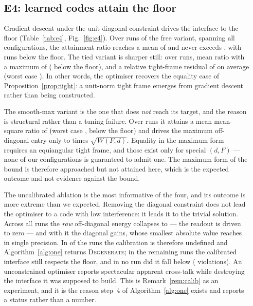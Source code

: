 \subsection{E4: learned codes attain the floor}
\label{sec:res-e4}

Gradient descent under the unit-diagonal constraint drives the interface to the floor
(Table~\ref{tab:e4}, Fig.~\ref{fig:e4}). Over
\EfourFreeRuns{} runs of the free variant, spanning all \EfourConfigs{} configurations, the
attainment ratio reaches a mean of \EfourFreeRatioMean{} and never exceeds
\EfourFreeRatioMax, with \EfourFreeBelowFloor{} runs below the floor. The tied variant is
sharper still: over \EfourTiedRuns{} runs, mean ratio \EfourTiedRatioMean{} with a maximum of
\EfourTiedRatioMax{} (\EfourTiedBelowFloor{} below the floor), and a relative tight-frame
residual of \EfourTiedFrameResidualMean{} on average (worst case
\EfourTiedFrameResidualMax). In other words, the optimiser recovers the equality case of
Proposition~\ref{prop:tight}: a unit-norm tight frame emerges from gradient descent rather than
being constructed.

The smooth-max variant is the one that does \emph{not} reach its target, and the reason is
structural rather than a tuning failure. Over \EfourSoftmaxRuns{} runs it attains a mean
mean-square ratio of \EfourSoftmaxRatioMean{} (worst case \EfourSoftmaxRatioMax,
\EfourSoftmaxBelowFloor{} below the floor) and drives the maximum off-diagonal entry only to
\EfourSoftmaxRatioMaxMean{} times $\sqrt{W(F,d)}$. Equality in the maximum form requires an
equiangular tight frame, and those exist only for special $(d,F)$ --- none of our
\EfourConfigs{} configurations is guaranteed to admit one. The maximum form of the bound is
therefore approached but not attained here, which is the expected outcome and not evidence
against the bound.

The uncalibrated ablation is the most informative of the four, and its outcome is more extreme
than we expected. Removing the diagonal constraint does not lead the optimiser to a code with
low interference: it leads it to the trivial solution. Across all \EfourUncalRuns{} runs the
\emph{raw} off-diagonal energy collapses to \EfourUncalRawRatioMean{} --- the readout is driven
to zero --- and with it the diagonal gains, whose smallest absolute value reaches
\EfourUncalGainMin{} in single precision. In \EfourUncalDegenerate{} of the
\EfourUncalRuns{} runs the calibration is therefore undefined and Algorithm~\ref{alg:one}
returns \textsc{Degenerate}; in the remaining runs the calibrated interface still respects the
floor, and in no run did it fall below (\EfourUncalBelowFloor{} violations). An unconstrained
optimiser reports spectacular apparent cross-talk while destroying the interface it was
supposed to build. This is Remark~\ref{rem:calib} as an experiment, and it is the reason
step~4 of Algorithm~\ref{alg:one} exists and reports a status rather than a number.

